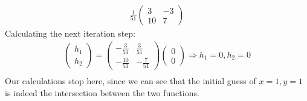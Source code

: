 \begin{gather*}
\frac{1}{51}\left( \begin{array}{cc}
3 & -3 \\
10 & 7
\end{array} \right)
\end{gather*}
Calculating the next iteration step:
\begin{gather*}
\left( \begin{array}{c}
h_1\\
h_2
\end{array} \right) = 
\left( \begin{array}{cc}
-\frac{3}{51} & \frac{3}{51}\\
-\frac{10}{51} & -\frac{7}{51}
\end{array} \right)
\left( \begin{array}{c}
0 \\ 
0
\end{array} \right) \Rightarrow h_1 = 0, h_2 = 0\\
\end{gather*}
Our calculations stop here, since we can see that the initial guess of $x=1,y=1$ is indeed the intersection between the two functions.

